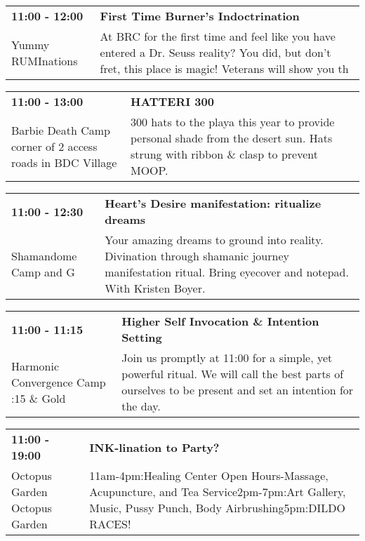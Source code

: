 \begin{tabular}{ p{1in} p{2.2in} }
    \textbf{11:00 - 12:00} & \textbf{First Time Burner's Indoctrination} \\
    Yummy RUMInations \newline  & At BRC for the first time and feel like you have entered a Dr. Seuss reality?  You did, but don't fret, this place is magic! Veterans will show you th \\
    \hline 
\end{tabular}
    
\begin{tabular}{ p{1in} p{2.2in} }
    \textbf{11:00 - 13:00} & \textbf{HATTERI 300} \\
    Barbie Death Camp \newline corner of 2 access roads in BDC Village & 300 hats to the playa this year to provide personal shade from the desert sun. Hats strung with ribbon \& clasp to prevent MOOP. \\
    \hline 
\end{tabular}
    
\begin{tabular}{ p{1in} p{2.2in} }
    \textbf{11:00 - 12:30} & \textbf{Heart's Desire manifestation: ritualize dreams } \\
    Shamandome Camp \newline 615 and G & Your amazing dreams to ground into reality.  Divination through shamanic journey manifestation ritual. Bring eyecover and notepad. With Kristen Boyer. \\
    \hline 
\end{tabular}
    
\begin{tabular}{ p{1in} p{2.2in} }
    \textbf{11:00 - 11:15} & \textbf{Higher Self Invocation \& Intention Setting} \\
    Harmonic Convergence Camp \newline 4:15 \& Gold & Join us promptly at 11:00 for a simple, yet powerful ritual.  We will call the best parts of ourselves to be present and set an intention for the day. \\
    \hline 
\end{tabular}
    
\begin{tabular}{ p{1in} p{2.2in} }
    \textbf{11:00 - 19:00} & \textbf{INK-lination to Party?} \\
    Octopus Garden \newline Octopus Garden & 11am-4pm:Healing Center Open Hours-Massage, Acupuncture, and Tea Service2pm-7pm:Art Gallery, Music, Pussy Punch, Body Airbrushing5pm:DILDO RACES! \\
    \hline 
\end{tabular}
    
